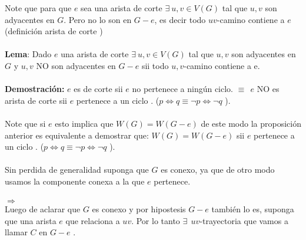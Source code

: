 \documentclass[]{article}
\begin{document}
Note que para que $e$ sea una arista de corte $\exists \: u,v \in V(G)$ tal que  $u,v$ son adyacentes en $G$. Pero no lo son en $G - e $, es decir todo $uv$-camino contiene  a $e$ (definición arista de corte )
 \\ 
 \\
\textbf{Lema}: Dado $e$ una arista de corte $\exists \: u,v \in V(G) $ tal que $u,v$ son adyacentes en $G$ y $u,v$ NO son adyacentes en $G - e$ sii todo $u,v$-camino contiene a e. 
\\ 
\\
\textbf{Demostración:} $e$ es de corte sii $e$ no pertenece a ningún ciclo.  $ \equiv  \: \: e$ NO es arista de corte sii $e$ pertenece a un ciclo . ($p \iff q  \equiv   \neg p \iff \neg q $ ).
\\
\\ 
Note que si $e$ esto implica que $W(G) = W(G - e)$ de este modo la proposición  anterior es equivalente a demostrar  que:  $W(G) = W(G - e)$ sii $e$ pertenece a un ciclo . ($p \iff q  \equiv   \neg p \iff \neg q $ ).
\\
\\ 
Sin perdida de generalidad suponga que $G$ es conexo, ya que de otro modo usamos la componente conexa a la que $e$ pertenece.
\\
\\
$\Rightarrow$
\\

Luego de aclarar que $G$ es conexo y por hipostesis $G-e$ también lo es, suponga que una arista $e$ que relaciona a $uv$. Por lo tanto $\exists \:\: uv$-trayectoria que vamos a llamar $C$  en $G-e$ .
\end{document}
